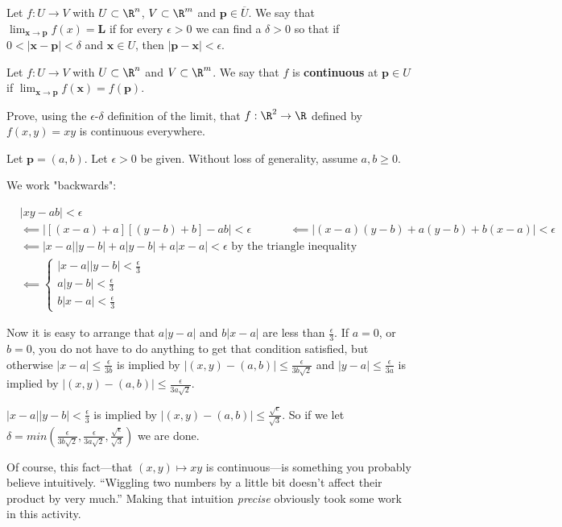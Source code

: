 \documentclass{ximera}
\begin{document}
\begin{definition}
	Let $f:U \to  V$  with $U \subset \R^n$, $V \subset \R^m$ and $\mathbf{p} \in \overline{U}$.  We say that $\lim_{\mathbf{x} \to \mathbf{p}}f(x) = \mathbf{L}$ if for every $\epsilon >0$ we can find a 
	$\delta>0$ so that if $0<|\mathbf{x}-\mathbf{p}|<\delta$ and $\mathbf{x} \in U$, then $|\mathbf{p}-\mathbf{x}|<\epsilon$.
\end{definition}

\begin{definition}
	 Let $f:U \to  V$  with $U \subset \R^n$ and $V \subset \R^m$.  We say that $f$ is \textbf{continuous} at $\mathbf{p} \in U$ if $\lim_{\mathbf{x} \to \mathbf{p}} f(\mathbf{x}) = f(\mathbf{p})$. 
\end{definition}

Prove, using the $\epsilon$-$\delta$ definition of the limit, that $f:\R^2 \to \R$ defined by $f(x,y) = xy$ is continuous everywhere.

\begin{free-response}
	Let $\mathbf{p} = (a,b)$.   Let $\epsilon>0$ be given.  Without loss of generality, assume $a,b \geq 0$.
	
	We work "backwards":
	
	\begin{align*}
		&|xy-ab|<\epsilon\\
		&\impliedby |[(x-a)+a][(y-b)+b]-ab| <\epsilon
		&\impliedby |(x-a)(y-b)+a(y-b) +b(x-a)| <\epsilon \\
		&\impliedby |x-a||y-b|+a|y-b|+a|x-a|< \epsilon \text{ by the triangle inequality}\\
		&\impliedby \begin{cases}
			|x-a||y-b| < \frac{\epsilon}{3}\\
			a|y-b| < \frac{\epsilon}{3}\\
			b|x-a| < \frac{\epsilon}{3}
			\end{cases}
	\end{align*}
	
	Now it is easy to arrange that $a|y-a|$  and $b|x-a|$ are less than $\frac{\epsilon}{3}$.  If $a=0$, or $b=0$, 
	you do not have to do anything to get that condition satisfied, but otherwise $|x-a| \leq \frac{\epsilon}{3b}$ is implied by $|(x,y) - (a,b)| \leq \frac{\epsilon}{3b\sqrt{2}}$
	and  $|y-a| \leq \frac{\epsilon}{3a}$ is implied by $|(x,y) - (a,b)| \leq \frac{\epsilon}{3a\sqrt{2}}$.
	
	$|x-a||y-b| < \frac{\epsilon}{3}$ is implied by $|(x,y)-(a,b)| \leq \frac{\sqrt{\epsilon}}{\sqrt{3}}$.  
	So if we let $\delta = min(\frac{\epsilon}{3b\sqrt{2}}, \frac{\epsilon}{3a\sqrt{2}}, \frac{\sqrt{\epsilon}}{\sqrt{3}})$ 
	we are done.
\end{free-response}

Of course, this fact---that $(x,y) \mapsto xy$ is continuous---is something you probably believe intuitively.  ``Wiggling two numbers by a little bit doesn't affect their product by very much.''  Making that intuition \textit{precise} obviously took some work in this activity.
\end{document}
